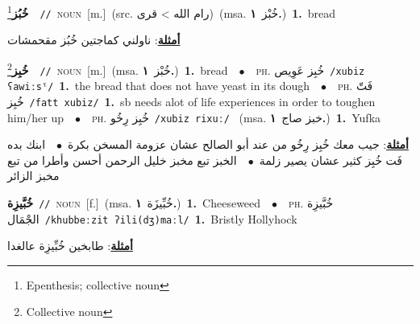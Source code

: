 \documentclass[10pt,a4paper,twoside]{article} %
\begin{document}
\begin{multicols}{2}
{\setlength\topsep{0pt}\textbf{\foreignlanguage{arabic}{خُبُز}}\footnote{Epenthesis; collective noun}\ \ {\color{gray}\texttt{//}\color{black}}\ \textsc{noun}\ [m.]\ (src. \color{gray}\foreignlanguage{arabic}{رام الله > قرى}\color{black})\ \color{gray}(msa. \foreignlanguage{arabic}{خُبْز}~\foreignlanguage{arabic}{\textbf{١.}})\color{black}\ \textbf{1.}~bread\  \begin{flushright}\color{gray}\foreignlanguage{arabic}{\textbf{\underline{\foreignlanguage{arabic}{أمثلة}}}: ناولني كماجتين خُبُز مقحمشات}\end{flushright}\color{black}} \vspace{2mm}

{\setlength\topsep{0pt}\textbf{\foreignlanguage{arabic}{خُبِز}}\footnote{Collective noun}\ \ {\color{gray}\texttt{//}\color{black}}\ \textsc{noun}\ [m.]\ \color{gray}(msa. \foreignlanguage{arabic}{خُبْز}~\foreignlanguage{arabic}{\textbf{١.}})\color{black}\ \textbf{1.}~bread\ \ $\bullet$\ \ \textsc{ph.} \color{gray} \foreignlanguage{arabic}{خُبِز عَوِيص}\color{black}\ {\color{gray}\texttt{/{\sffamily xubiz ʕawiːsˤ}/}\color{black}}\ \textbf{1.}~the bread that does not have yeast in its dough\ \ $\bullet$\ \ \textsc{ph.} \color{gray} \foreignlanguage{arabic}{فَتّ خُبِز}\color{black}\ {\color{gray}\texttt{/{\sffamily fatt xubiz}/}\color{black}}\ \textbf{1.}~sb needs alot of life experiences in order to toughen him/her up\ \ $\bullet$\ \ \textsc{ph.} \color{gray} \foreignlanguage{arabic}{خُبِز رِخُو}\color{black}\ {\color{gray}\texttt{/{\sffamily xubiz rixuː}/}\color{black}}\ \color{gray} (msa. \foreignlanguage{arabic}{خبز صاج}~\foreignlanguage{arabic}{\textbf{١.}})\color{black}\ \textbf{1.}~Yufka\  \begin{flushright}\color{gray}\foreignlanguage{arabic}{\textbf{\underline{\foreignlanguage{arabic}{أمثلة}}}: جيب معك خُبِز رِخُو من عند أبو الصالح عشان عزومة المسخن بكرة\ $\bullet$\ \  ابنك بده فَت خُبِز كثير عشان يصير زلمة\ $\bullet$\ \  الخبز تبع مخبز خليل الرحمن أحسن وأطرا من تبع مخبز الزائر}\end{flushright}\color{black}} \vspace{2mm}

{\setlength\topsep{0pt}\textbf{\foreignlanguage{arabic}{خُبَّيزِة}}\ {\color{gray}\texttt{//}\color{black}}\ \textsc{noun}\ [f.]\ \color{gray}(msa. \foreignlanguage{arabic}{خُبِّيزَة}~\foreignlanguage{arabic}{\textbf{١.}})\color{black}\ \textbf{1.}~Cheeseweed\ \ $\bullet$\ \ \textsc{ph.} \color{gray} \foreignlanguage{arabic}{خُبَّيزِة الجْمَال}\color{black}\ {\color{gray}\texttt{/{\sffamily khubbeːzit ʔili(dʒ)maːl}/}\color{black}}\ \textbf{1.}~Bristly Hollyhock\  \begin{flushright}\color{gray}\foreignlanguage{arabic}{\textbf{\underline{\foreignlanguage{arabic}{أمثلة}}}: طابخين خُبِّيزِة عالغدا}\end{flushright}\color{black}} \vspace{2mm}


\end{multicols}
\end{document}
